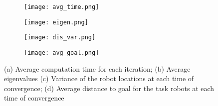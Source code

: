 \documentclass[../main.tex]{subfiles}
\begin{document}
\begin{figure}
\centering
\begin{subfigure}{0.49\textwidth}
\texttt{[image: avg\_time.png]}
\caption{}
\label{fig:avg_time}
\end{subfigure}
\begin{subfigure}{0.49\textwidth}
\texttt{[image: eigen.png]}
\caption{}
\label{fig:eigen}
\end{subfigure}
\begin{subfigure}{0.49\textwidth}
\texttt{[image: dis\_var.png]}
\caption{}
\label{fig:dis_var}
\end{subfigure}
\begin{subfigure}{0.49\textwidth}
\texttt{[image: avg\_goal.png]}
\caption{}
\label{fig:avg_goal}
\end{subfigure}
\caption{(a) Average computation time for each iteration; (b) Average eigenvalues (c) Variance of the robot locations at each time of convergence; (d) Average distance to goal for the task robots at each time of convergence}
\label{fig:dis_goal}
\end{figure}
\end{document}
